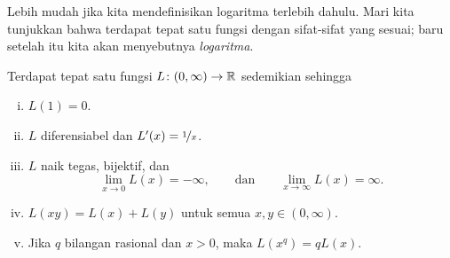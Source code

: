 Lebih mudah jika kita mendefinisikan logaritma terlebih dahulu.
Mari kita tunjukkan bahwa
terdapat tepat satu fungsi dengan sifat-sifat yang sesuai; baru setelah itu
kita akan menyebutnya \emph{logaritma}.

\begin{prop}
Terdapat tepat satu fungsi $L \colon (0,\infty) \to {\mathbb{R}}$ sedemikian sehingga
\begin{enumerate}[(i)]
\item \label{it:log:i}
$L(1) = 0$.
\item \label{it:log:ii}
$L$ diferensiabel dan $L'(x) = \nicefrac{1}{x}$.
\item \label{it:log:iii}
$L$ naik tegas, bijektif, dan
\begin{equation*}
\lim_{x\to 0} L(x) = -\infty , \qquad \text{dan} \qquad
\lim_{x\to \infty} L(x) = \infty .
\end{equation*}
\item \label{it:log:iv}
$L(xy) = L(x)+L(y)$ untuk semua $x,y \in (0,\infty)$.
\item \label{it:log:v}
Jika $q$ bilangan rasional dan $x > 0$, maka
$L(x^q) = q L(x)$.
\end{enumerate}
\end{prop}

